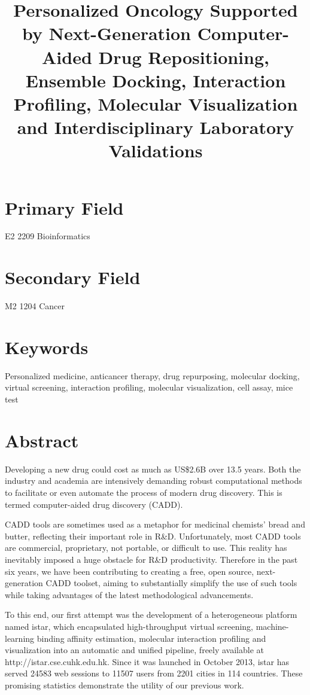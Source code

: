 \documentclass[a4paper,12pt]{article}
\begin{document}
\title{Personalized Oncology Supported by Next-Generation Computer-Aided Drug Repositioning, Ensemble Docking, Interaction Profiling, Molecular Visualization and Interdisciplinary Laboratory Validations}
\maketitle

\section*{Primary Field}

E2 2209 Bioinformatics

\section*{Secondary Field}

M2 1204 Cancer

\section*{Keywords}

Personalized medicine, anticancer therapy, drug repurposing, molecular docking, virtual screening, interaction profiling, molecular visualization, cell assay, mice test

\section*{Abstract}

Developing a new drug could cost as much as US\$2.6B over 13.5 years. Both the industry and academia are intensively demanding robust computational methods to facilitate or even automate the process of modern drug discovery. This is termed computer-aided drug discovery (CADD).

CADD tools are sometimes used as a metaphor for medicinal chemists' bread and butter, reflecting their important role in R\&D. Unfortunately, most CADD tools are commercial, proprietary, not portable, or difficult to use. This reality has inevitably imposed a huge obstacle for R\&D productivity. Therefore in the past six years, we have been contributing to creating a free, open source, next-generation CADD toolset, aiming to substantially simplify the use of such tools while taking advantages of the latest methodological advancements.

To this end, our first attempt was the development of a heterogeneous platform named istar, which encapsulated high-throughput virtual screening, machine-learning binding affinity estimation, molecular interaction profiling and visualization into an automatic and unified pipeline, freely available at http://istar.cse.cuhk.edu.hk. Since it was launched in October 2013, istar has served 24583 web sessions to 11507 users from 2201 cities in 114 countries. These promising statistics demonstrate the utility of our previous work.
\end{document}
